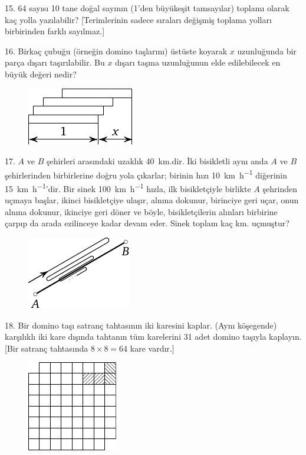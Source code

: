 \begin{problem}{15.}
64 sayısı 10 tane doğal sayının (1'den büyükeşit tamsayılar) toplamı olarak kaç yolla yazılabilir? [Terimlerinin sadece sıraları de\-ğiş\-miş  toplama yolları birbirinden farklı sayılmaz.]
\end{problem}

\begin{problem}{16.}
Birkaç çubuğu (örneğin domino taşlarını) üstüste koyarak $x$ u\-zun\-lu\-ğun\-da bir parça dışarı taşırılabilir.  Bu $x$ dışarı taşma uzunluğunun elde e\-di\-le\-bi\-le\-cek en büyük değeri  nedir?
	\begin{figure}
		\includegraphics{resources/taskbook-97}
	\end{figure}
\end{problem}

\begin{problem}{17.}
$A$ ve $B$ şehirleri arasındaki uzaklık \SI{40}{\km}.dir. İki bisikletli aynı anda $A$ ve $B$ şehirlerinden birbirlerine doğru yola çıkarlar; birinin hızı \SI{10}{\km\per\hour} diğerinin \SI{15}{\km\per\hour}'dir. Bir sinek \SI{100}{\km\per\hour} hızla, ilk bisikletçiyle birlikte $A$ şehrinden uçmaya başlar, ikinci bisikletçiye ulaşır, alnına dokunur, birinciye geri uçar, onun alnına dokunur, ikinciye geri döner ve böyle, bisikletçilerin alınları birbirine çarpıp da arada ezilinceye kadar devam eder. Sinek toplam kaç km. uçmuştur?
	\begin{figure}
		\includegraphics{resources/taskbook-1}
	\end{figure}
\end{problem}

\begin{problem}{18.}
Bir domino taşı satranç tahtasının iki karesini kaplar.  (Aynı köşegende) karşılıklı iki kare dışında tahtanın tüm karelerini 31 adet domino taşıyla kaplayın. [Bir satranç tahtasında $8 \times 8 = 64$ kare vardır.]
	\begin{figure}
		\includegraphics{resources/taskbook-2}
	\end{figure}
\end{problem}


